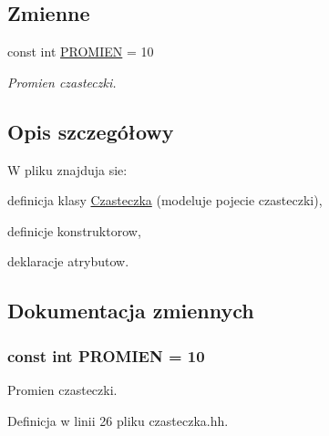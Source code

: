 \subsection*{Zmienne}
\begin{DoxyCompactItemize}
\item 
const int \hyperlink{czasteczka_8hh_aa77f856f3142a9e81752665a9bc2e6de}{P\+R\+O\+M\+I\+E\+N} = 10
\begin{DoxyCompactList}\small\item\em Promien czasteczki. \end{DoxyCompactList}\end{DoxyCompactItemize}


\subsection{Opis szczegółowy}
W pliku znajduja sie\+:
\begin{DoxyItemize}
\item definicja klasy \hyperlink{class_czasteczka}{Czasteczka} (modeluje pojecie czasteczki),
\item definicje konstruktorow,
\item deklaracje atrybutow. 
\end{DoxyItemize}

\subsection{Dokumentacja zmiennych}
\hypertarget{czasteczka_8hh_aa77f856f3142a9e81752665a9bc2e6de}{}
\subsubsection[{P\+R\+O\+M\+I\+E\+N}]{\setlength{\rightskip}{0pt plus 5cm}const int P\+R\+O\+M\+I\+E\+N = 10}\label{czasteczka_8hh_aa77f856f3142a9e81752665a9bc2e6de}
Promien czasteczki. 

Definicja w linii 26 pliku czasteczka.\+hh.

